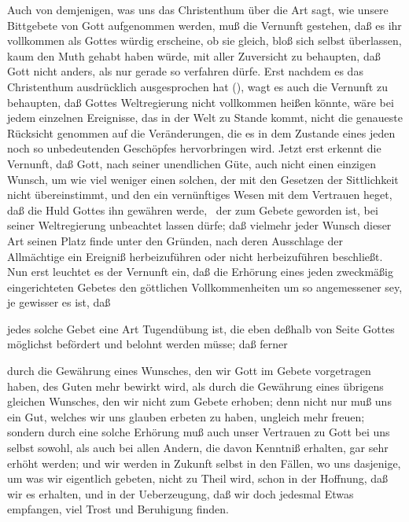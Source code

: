 \begin{aufza}
\item Auch von demjenigen, was uns das Christenthum über die Art sagt, wie unsere Bittgebete von Gott aufgenommen werden, muß die Vernunft gestehen, daß es ihr vollkommen als Gottes würdig erscheine, ob sie gleich, bloß sich selbst überlassen, kaum den Muth gehabt haben würde, mit aller Zuversicht zu behaupten, daß Gott nicht anders, als nur gerade so verfahren dürfe. Erst nachdem es das Christenthum ausdrücklich ausgesprochen hat (), wagt es auch die Vernunft zu behaupten, daß Gottes Weltregierung nicht vollkommen heißen könnte, wäre bei jedem einzelnen Ereignisse, das in der Welt zu Stande kommt, nicht die genaueste Rücksicht genommen auf die Veränderungen, die es in dem Zustande eines jeden noch so unbedeutenden Geschöpfes hervorbringen wird. Jetzt erst erkennt die Vernunft, daß Gott, nach seiner unendlichen Güte, auch nicht einen einzigen Wunsch, um wie viel weniger einen solchen, der mit den Gesetzen der Sittlichkeit nicht übereinstimmt, und den ein vernünftiges Wesen mit dem Vertrauen heget, daß die Huld Gottes ihn gewähren werde, \dh\ der zum Gebete geworden ist, bei seiner Weltregierung unbeachtet lassen dürfe; daß vielmehr jeder Wunsch dieser Art seinen Platz finde unter den Gründen, nach deren Ausschlage der Allmächtige ein Ereigniß herbeizuführen oder nicht herbeizuführen beschließt. Nun erst leuchtet es der Vernunft ein, daß die Erhörung eines jeden zweckmäßig eingerichteten Gebetes den göttlichen Vollkommenheiten um so angemessener sey, je gewisser es ist, daß
\begin{aufzb}
\item jedes solche Gebet eine Art Tugendübung ist, die eben deßhalb von Seite Gottes möglichst befördert und belohnt werden müsse; daß ferner
\item durch die Gewährung eines Wunsches, den wir Gott im Gebete vorgetragen haben, des Guten mehr bewirkt wird, als durch die Gewährung eines übrigens gleichen Wunsches, den wir nicht zum Gebete erhoben; denn nicht nur muß uns ein Gut, welches wir uns glauben erbeten zu haben, ungleich mehr freuen; sondern durch eine solche Erhörung muß auch unser Vertrauen zu Gott bei uns selbst sowohl, als auch bei allen Andern, die davon Kenntniß erhalten, gar sehr erhöht werden; und wir werden in Zukunft selbst in den Fällen, wo uns dasjenige, um was wir eigentlich gebeten, nicht zu Theil wird, schon in der Hoffnung, daß wir es erhalten, und in der Ueberzeugung, daß wir doch jedesmal Etwas empfangen, viel Trost und Beruhigung finden.
\end{aufzb}\par

\end{aufza}
